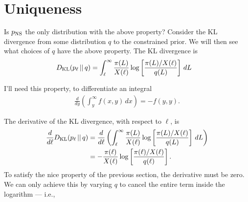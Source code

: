 \documentclass[a4paper, 12pt]{article}
\newcommand{\btheta}{\boldsymbol{\theta}}
\newcommand{\tn}{\textnormal}
\begin{document}
\section{Uniqueness}
Is $p_{\rm NS}$ the only distribution with the above property?
Consider the KL divergence from some distribution $q$
to the constrained prior.
We will then see what choices of $q$ have the above property.
The KL divergence is
\begin{align}
D_{\rm KL}(p_\ell \,||\, q)
  &= \int_{\ell}^{\infty} \frac{\pi(L)}{X(\ell)}
           \log\left[\frac{\pi(L)/X(\ell)}{q(L)}\right] \, dL
\end{align}

I'll need this property, to differentiate an integral
\begin{align}
\frac{d}{dy}\left(\int_y^\infty f(x, y) \, dx\right)
  = -f(y, y).
\end{align}

The derivative of the KL divergence, with respect to $\ell$, is
\begin{align}
\frac{d}{d\ell} D_{\rm KL}(p_\ell \,||\, q)
  &= \frac{d}{d\ell}\left(\int_{\ell}^{\infty} \frac{\pi(L)}{X(\ell)}
           \log\left[\frac{\pi(L)/X(\ell)}{q(L)}\right] \, dL\right) \\
  &= -\frac{\pi(\ell)}{X(\ell)}
           \log\left[\frac{\pi(\ell)/X(\ell)}{q(\ell)}\right].
\end{align}
To satisfy the nice property of the previous section, the derivative
must be zero. We can only achieve this by varying $q$ to cancel
the entire term inside the logarithm --- i.e., 


\end{document}
